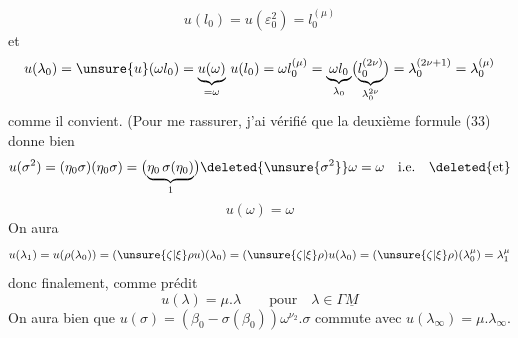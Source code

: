 \[
u(l_0)=u(\varepsilon_0^2)=l_0^{(\mu)}
\]
et
\[
u(\lambda_0)=\unsure{u}(\omega l_0)
=\underbrace{u(\omega)}_{=\omega}\,u(l_0)
=\omega l_0^{(\mu)}
=\underbrace{\omega l_0}_{\lambda_0}
 \bigl(\underbrace{l_0^{(2\nu)}}_{\lambda_0^{2\nu}}\bigr)
=\lambda_0^{(2\nu+1)}=\lambda_0^{(\mu)}
\]
comme il convient. (Pour me rassurer, j'ai vérifié que la deuxième formule (33) donne bien
\[
u(\sigma^2)=(\eta_0\sigma)(\eta_0\sigma)
=\bigl(\underbrace{\eta_0\,\sigma(\eta_0)}_{1}\bigr)
 \deleted{\unsure{\sigma^2}}\omega=\omega
\quad\text{i.e.}\quad\deleted{\text{et}}
\]
\[
\tag{37} u(\omega)=\omega
\]
On aura
\[
u(\lambda_1)=u(\rho(\lambda_0))
=(\unsure{\zeta|\xi}\rho u)(\lambda_0)
=(\unsure{\zeta|\xi}\rho)u(\lambda_0)
=(\unsure{\zeta|\xi}\rho)(\lambda_0^\mu)=\lambda_1^\mu
\]
donc finalement, comme prédit
\[
\tag{38} u(\lambda)=\mu.\lambda\qquad\text{pour}\quad\lambda\in\Gamma\underline M
\]
On aura bien que $u(\sigma)=(\beta_0-\sigma(\beta_0))\omega^{\nu_2}.\sigma$
commute avec $u(\lambda_\infty)=\mu.\lambda_\infty$.

